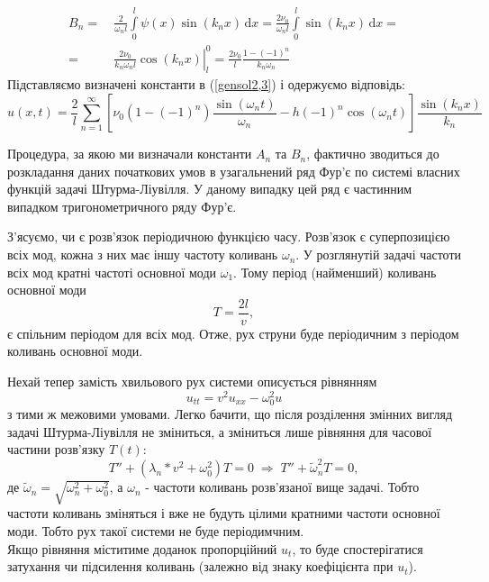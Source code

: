 \begin{equation*}
    \begin{aligned}
        B_n =&\ \frac{2}{\omega_n l} \int\limits_0^l \psi(x) \sin(k_n x) \,\mathrm{d}x = \frac{2\nu_0}{\omega_n l} \int\limits_0^l \sin(k_n x) \,\mathrm{d}x =\\
        =&\ \left.\frac{2\nu_0}{k_n\omega_n l} \cos(k_n x)\right|_l^0 = \frac{2\nu_0}{l} \frac{1 - (-1)^n}{k_n\omega_n}
    \end{aligned}
\end{equation*}
Підставляємо визначені константи в (\ref{gensol2,3}) і одержуємо відповідь:
\begin{equation} \label{Cauchy-sol2,3}
    u(x,t) = \frac{2}{l}\sum^{\infty}_{n=1} \left[\nu_0 (1 - (-1)^n)\frac{\sin(\omega_n t)}{\omega_n} - h(-1)^n\cos(\omega_n t)\right] \frac{\sin(k_n x)}{k_n}
\end{equation}

Процедура, за якою ми визначали константи $A_n$ та $B_n$, фактично зводиться до розкладання даних початкових умов в узагальнений ряд Фур'є по системі власних функцій задачі Штурма-Ліувілля. У даному випадку цей ряд є частинним випадком тригонометричного ряду Фур'є. 

З'ясуємо, чи є розв'язок періодичною функцією часу. Розв'язок є суперпозицією всіх мод, кожна з них має іншу частоту коливань $\omega_n$. У розглянутій задачі  частоти всіх мод кратні частоті основної моди $\omega_1$. Тому період (найменший) коливань основної моди \[T = \frac{2l}{v},\] є спільним періодом для всіх мод. Отже, рух струни буде періодичним з періодом коливань основної моди. 

Нехай тепер замість хвильового рух системи описується рівнянням \[u_{tt} = v^2 u_{xx} - \omega_0^2 u\] з тими ж межовими умовами. Легко бачити, що після розділення змінних вигляд задачі Штурма-Ліувілля не зміниться, а зміниться лише рівняння для часової частини розв'язку $T(t)$:
\begin{equation*}
    T'' + (\lambda_n*v^2 + \omega_0^2) T = 0
    \;\Rightarrow\; 
    T'' + \widetilde{\omega}_n^2 T = 0,
\end{equation*}
де $\widetilde{\omega}_n = \sqrt{\omega_n^2 + \omega_0^2}$, а $\omega_n$ - частоти коливань розв'язаної вище задачі. Тобто частоти коливань зміняться і вже не будуть цілими кратними частоти основної моди. Тобто рух такої системи не буде періодимчним.\\
Якщо рівняння міститиме доданок пропорційний $u_t$, то буде спостерігатися затухання чи підсилення коливань (залежно від знаку коефіцієнта при $u_t$).

%